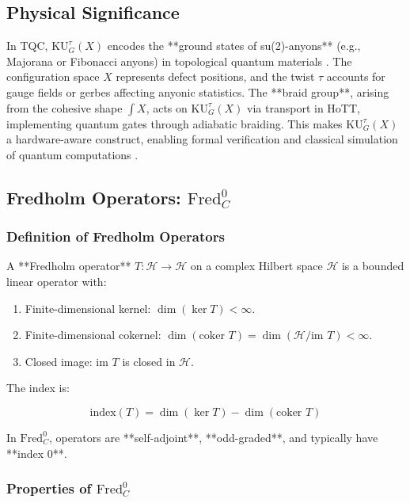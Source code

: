 \documentclass{article}
\theoremstyle{definition}
\begin{document}
\subsection{Physical Significance}

In TQC, \(\mathrm{KU}^\tau_G(X)\) encodes the **ground states of su(2)-anyons** (e.g., Majorana or Fibonacci anyons) in topological quantum materials \cite{SatiSchreiber2022Anyonic}. The configuration space \(X\) represents defect positions, and the twist \(\tau\) accounts for gauge fields or gerbes affecting anyonic statistics. The **braid group**, arising from the cohesive shape \(\int X\), acts on \(\mathrm{KU}^\tau_G(X)\) via transport in HoTT, implementing quantum gates through adiabatic braiding. This makes \(\mathrm{KU}^\tau_G(X)\) a hardware-aware construct, enabling formal verification and classical simulation of quantum computations \cite{SatiSchreiber2022}.

\subsection{Fredholm Operators: \(\text{Fred}^0_C\)}
\label{sec:fredholm}

\subsubsection{Definition of Fredholm Operators}

A **Fredholm operator** \(T: \mathscr{H} \to \mathscr{H}\) on a complex Hilbert space \(\mathscr{H}\) is a bounded linear operator with:

\begin{enumerate}
    \item Finite-dimensional kernel: \(\dim(\ker T) < \infty\).
    \item Finite-dimensional cokernel: \(\dim(\text{coker } T) = \dim(\mathscr{H} / \text{im } T) < \infty\).
    \item Closed image: \(\text{im } T\) is closed in \(\mathscr{H}\).
\end{enumerate}

The index is:

\begin{equation}
\text{index}(T) = \dim(\ker T) - \dim(\text{coker } T)
\end{equation}

In \(\text{Fred}^0_C\), operators are **self-adjoint**, **odd-graded**, and typically have **index 0**.

\subsubsection{Properties of \(\text{Fred}^0_C\)}
\end{document}
